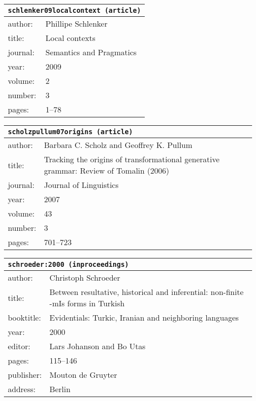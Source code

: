 \documentclass{article}
\begin{document}
\bigskip

\begin{tabular}{p{}p{}}
\multicolumn{2}{l}{\texttt{schlenker09localcontext (article)}}\\
\hline
author: & Phillipe Schlenker\\
title: & Local contexts\\
journal: & Semantics and Pragmatics\\
year: & 2009\\
volume: & 2\\
number: & 3\\
pages: & 1--78\\
\end{tabular}

\bigskip

\begin{tabular}{p{}p{}}
\multicolumn{2}{l}{\texttt{scholzpullum07origins (article)}}\\
\hline
author: & Barbara C. Scholz and Geoffrey K. Pullum\\
title: & Tracking the origins of transformational generative grammar: Review of Tomalin (2006)\\
journal: & Journal of Linguistics\\
year: & 2007\\
volume: & 43\\
number: & 3\\
pages: & 701--723\\
\end{tabular}

\bigskip

\begin{tabular}{p{}p{}}
\multicolumn{2}{l}{\texttt{schroeder:2000 (inproceedings)}}\\
\hline
author: & Christoph Schroeder\\
title: & Between resultative, historical and inferential: non-finite -mIs forms in Turkish\\
booktitle: & Evidentials: Turkic, Iranian and neighboring languages\\
year: & 2000\\
editor: & Lars Johanson and Bo Utas\\
pages: & 115--146\\
publisher: & Mouton de Gruyter\\
address: & Berlin\\
\end{tabular}
\end{document}
